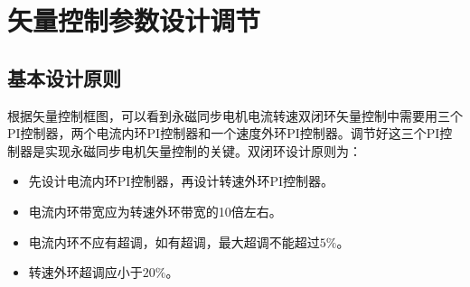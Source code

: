 \section{矢量控制参数设计调节}
\subsection{基本设计原则}
根据矢量控制框图，可以看到永磁同步电机电流转速双闭环矢量控制中需要用三个PI控制器，两个电流内环PI控制器和一个速度外环PI控制器。调节好这三个PI控制器是实现永磁同步电机矢量控制的关键。双闭环设计原则为：
\begin{itemize}
	\item 先设计电流内环PI控制器，再设计转速外环PI控制器。
	\item 电流内环带宽应为转速外环带宽的10倍左右。
	\item 电流内环不应有超调，如有超调，最大超调不能超过$5\%$。
	\item 转速外环超调应小于$20\%$。
\end{itemize}
